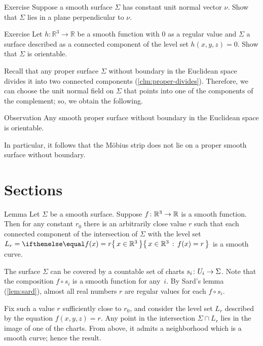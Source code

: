 \begin{thm}{Exercise}\label{ex:const-normal}
Suppose a smooth surface $\Sigma$ has constant unit normal vector $\nu$.
Show that $\Sigma$ lies in a plane perpendicular to $\nu$.
\end{thm}

\begin{thm}{Exercise}\label{ex:implicit-orientable}
Let $h:\mathbb{R}^3\to\mathbb{R}$ be a smooth function with $0$ as a regular value and $\Sigma$ a surface described as a connected component of the level set $h(x,y,z)=0$.
Show that $\Sigma$ is orientable.
\end{thm}

Recall that any proper surface $\Sigma$ without boundary in the Euclidean space divides it into two connected components (\ref{clm:proper-divides}).
Therefore, we can choose the unit normal field on $\Sigma$ that points into one of the components of the complement; so, we obtain the following.

\begin{thm}{Observation}
Any smooth proper surface without boundary in the Euclidean space is orientable.
\end{thm}

In particular, it follows that the Möbius strip does not lie on a proper smooth surface without boundary.

\section{Sections}

\begin{thm}{Lemma}\label{lem:reg-section}
Let $\Sigma$ be a smooth surface.
Suppose $f\:\mathbb{R}^3\z\to\mathbb{R}$ is a smooth function.
Then for any constant $r_0$ there is an arbitrarily close value $r$ such that 
each connected component of the intersection of $\Sigma$ with the level set $L_r=\set{x\in\mathbb{R}^3}{f(x)=r}$ is a smooth curve.
\end{thm}

The surface $\Sigma$ can be covered by a countable set of charts $s_i\:U_i\z\to \Sigma$.
Note that the composition $f\circ s_i$ is a smooth function for any~$i$.
By Sard's lemma (\ref{lem:sard}), almost all real numbers $r$ are regular values for each $f\circ s_i$.

Fix such a value $r$ sufficiently close to $r_0$, and consider the level set $L_r$ described by the equation $f(x,y,z)=r$.
Any point in the intersection $\Sigma\cap L_r$ lies in the image of one of the charts.
From above, it admits a neighborhood which is a smooth curve;
hence the result.
\qeds

